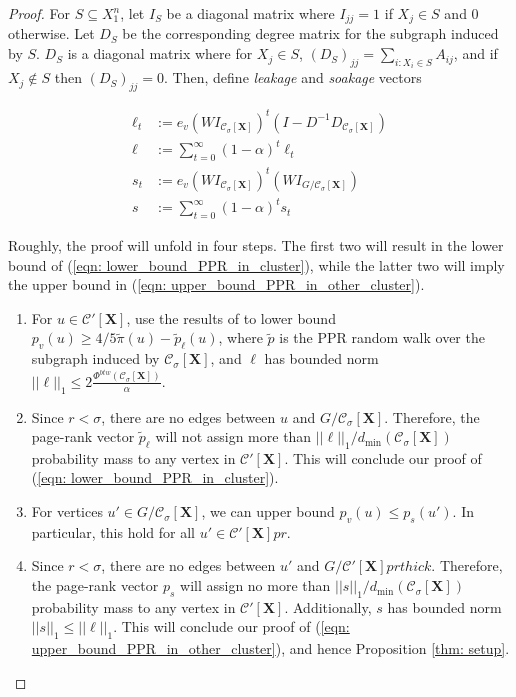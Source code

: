 \documentclass{article}
\newcommand{\1}{\mathbf{1}}
\newcommand{\Xbf}{\mathbf{X}}
\newcommand{\Cset}{\mathcal{C}}
\newcommand{\Csig}{\Cset_{\sigma}}
\theoremstyle{aldenthm}
\begin{document}
\begin{proof}
	
	For $S \subseteq X_1^n$, let $I_{S}$ be a diagonal matrix where $I_{jj} = 1$ if $X_j \in S$ and 0 otherwise. Let $D_S$ be the corresponding degree matrix for the subgraph induced by $S$. $D_S$ is a diagonal matrix where for $X_j \in S$, $(D_S)_{jj} = \sum_{i: X_i \in S} A_{ij}$, and if $X_j \not \in S$ then $(D_S)_{jj} = 0$. Then, define \textit{leakage} and \textit{soakage} vectors
	
	\begin{align*}
	\ell_t & := e_v  (W I_{\Csig[\Xbf]})^t (I - D^{-1} D_{\Csig[\Xbf]}) \\
	\ell & := \sum_{t = 0}^{\infty} (1 - \alpha)^t \ell_t \\
	s_t & := e_v (W I_{\Csig[\Xbf]})^t (W I_{G / \Csig[\Xbf]}) \\
	s & := \sum_{t = 0}^{\infty} (1 - \alpha)^{t} s_t
	\end{align*}
	
	Roughly, the proof will unfold in four steps. The first two will result in the lower bound of (\ref{eqn: lower_bound_PPR_in_cluster}), while the latter two will imply the upper bound in (\ref{eqn: upper_bound_PPR_in_other_cluster}).
	
	\begin{enumerate}
		\item For $u \in \Cset'[\Xbf]$, use the results of \cite{zhu2013} to lower bound $p_v(u) \geq 4/5 \widetilde{\pi}(u) - \widetilde{p}_{\ell}(u)$, where $\widetilde{p}$ is the PPR random walk over the subgraph induced by $\Csig[\Xbf]$, and $\ell$ has bounded norm $||\ell||_1 \leq 2\frac{\Phi^{btw}(\Csig[\Xbf])}{\alpha}$.
		\item Since $r < \sigma$, there are no edges between $u$ and $G / \Csig[\Xbf]$. Therefore, the page-rank vector $\widetilde{p}_{\ell}$ will not assign more than $||\ell||_1 / d_{\min}(\Csig[\Xbf])$ probability mass to any vertex in $\Cset'[\Xbf]$. This will conclude our proof of (\ref{eqn: lower_bound_PPR_in_cluster}).
		\item For vertices $u' \in G / \Csig[\Xbf]$, we can upper bound $p_v(u) \leq p_s(u')$. In particular, this hold for all $u' \in \Cset'[\Xbf]pr$.
		\item Since $r < \sigma$, there are no edges between $u'$ and $G / \Cset'[\Xbf]prthick$. Therefore, the page-rank vector $p_{s}$ will assign no more than $||s||_1 / d_{\min}(\Csig[\Xbf])$ probability mass to any vertex in $\Cset'[\Xbf]$. Additionally, $s$ has bounded norm $||s||_1 \leq ||\ell||_1$. This will conclude our proof of (\ref{eqn: upper_bound_PPR_in_other_cluster}), and hence Proposition \ref{thm: setup}.
	\end{enumerate}
	

\end{proof}
\end{document}
